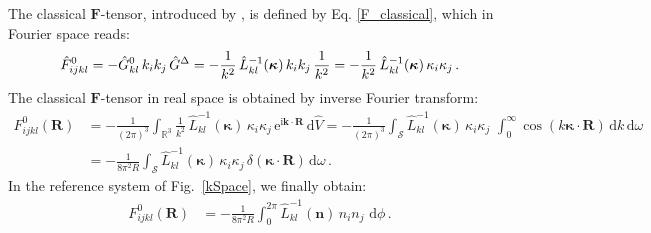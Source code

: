 The classical $\bm F$-tensor, introduced by  \cite{Kirchner:1983}, is defined by Eq. \eqref{F_classical}, which in Fourier space reads:
\begin{align}
\hat{F}^0_{ijkl}=-\hat{G}^0_{kl}\,k_ik_j\,\hat{G}^\Delta=-\frac{1}{k^2}\,\hat{L}^{-1}_{kl}(\bm \kappa)\,k_ik_j\, \frac{1}{k^2}=-\frac{1}{k^2}\,\hat{L}^{-1}_{kl}(\bm \kappa)\,\kappa_i\kappa_j\, .
\end{align}
The  classical $\bm F$-tensor in real space is obtained by inverse Fourier transform:
\begin{align}
F^0_{ijkl}(\bm R)&=-\frac{1}{(2\pi)^3}\int_{\mathbb{R}^3}\frac{1}{k^2}\,\hat{L}^{-1}_{kl}(\bm \kappa)\,\kappa_i\kappa_j\, \text{e}^{\text{i}\bm k\cdot\bm R} \, \text{d}\hat{V}
=-\frac{1}{(2\pi)^3}\int_\mathcal{S}\hat{L}^{-1}_{kl}(\bm \kappa)\,\kappa_i\kappa_j\,\, \int_0^\infty \cos(k\bm\kappa\cdot\bm R)\, \text{d}k  \, \text{d}\omega\nonumber\\
&=-\frac{1}{8\pi^2R}\int_\mathcal{S}\hat{L}^{-1}_{kl}(\bm \kappa)\,\kappa_i\kappa_j\, \delta(\bm\kappa\cdot\bm R)  \, \text{d}\omega\, .
\end{align}
In the reference system of Fig.~\ref{kSpace}, we finally obtain:
\begin{align}
F^0_{ijkl}(\bm R)&=-\frac{1}{8\pi^2R}\int_0^{2\pi}\hat{L}^{-1}_{kl}(\bm n)\,n_in_j\,   \, \text{d}\phi\, .
\label{F0}
\end{align}



